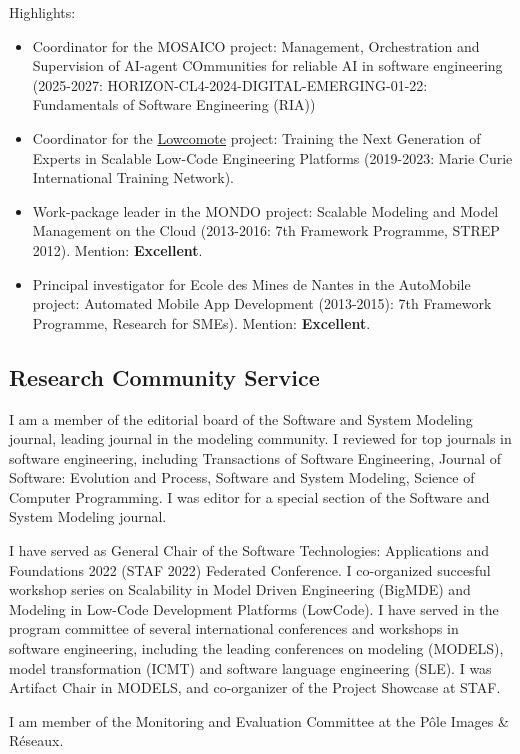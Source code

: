\medskip
Highlights:
 \begin{itemize}
 \item Coordinator for the MOSAICO project: Management, Orchestration and Supervision of AI-agent COmmunities
 for reliable AI in software engineering (2025-2027: HORIZON-CL4-2024-DIGITAL-EMERGING-01-22: Fundamentals of Software Engineering (RIA))
 \item Coordinator for the \href{https://www.lowcomote.eu/}{Lowcomote} project: Training the Next Generation of Experts in Scalable Low-Code Engineering Platforms (2019-2023: Marie Curie International Training Network).
 \item Work-package leader in the MONDO project: Scalable Modeling and Model Management on the Cloud (2013-2016: 7th Framework Programme, STREP 2012). Mention: \textbf{Excellent}.
 \item Principal investigator for Ecole des Mines de Nantes in the AutoMobile project: Automated Mobile App Development (2013-2015): 7th Framework Programme, Research for SMEs). Mention: \textbf{Excellent}.
\end{itemize}

\subsection*{Research Community Service}

I am a member of the editorial board of the Software and System Modeling journal, leading journal in the modeling community. I reviewed for top journals in software engineering, including Transactions of Software Engineering, Journal of Software: Evolution and Process, Software and System Modeling, Science of Computer Programming. I was editor for a special section of the Software and System Modeling journal.

I have served as General Chair of the Software Technologies: Applications and Foundations 2022 (STAF 2022) Federated Conference. I co-organized succesful workshop series on Scalability in Model Driven Engineering (BigMDE) and Modeling in Low-Code Development Platforms (LowCode). 
I have served in the program committee of several international conferences and workshops in software engineering, including the leading conferences on modeling (MODELS), model transformation (ICMT) and software language engineering (SLE). I was Artifact Chair in MODELS, and co-organizer of the Project Showcase at STAF.

I am member of the Monitoring and Evaluation Committee at the Pôle Images \& Réseaux.

